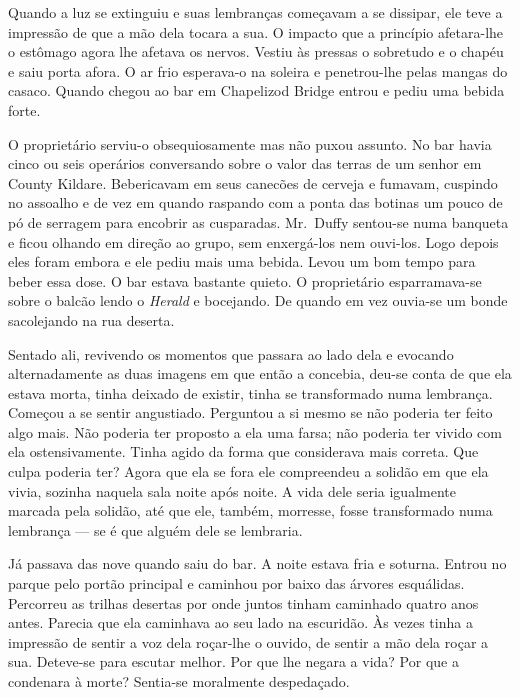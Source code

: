 Quando a luz se extinguiu e suas lembranças começavam a se dissipar, ele teve a
impressão de que a mão dela tocara a sua.  O impacto que a princípio
afetara-lhe o estômago agora lhe afetava os nervos.  Vestiu às pressas o
sobretudo e o chapéu e saiu porta afora.  O ar frio esperava-o na soleira e
penetrou-lhe pelas mangas do casaco.  Quando chegou ao bar em Chapelizod Bridge
entrou e pediu uma bebida forte.

O proprietário serviu-o obsequiosamente mas não puxou assunto.  No bar havia
cinco ou seis operários conversando sobre o valor das terras de um senhor em
County Kildare.  Bebericavam em seus canecões de cerveja e fumavam, cuspindo no
assoalho e de vez em quando raspando com a ponta das botinas um pouco de pó de
serragem para encobrir as cusparadas.  Mr.~Duffy sentou-se numa banqueta e
ficou olhando em direção ao grupo, sem enxergá-los nem ouvi-los.  Logo depois
eles foram embora e ele pediu mais uma bebida.  Levou um bom tempo para beber
essa dose.  O bar estava bastante quieto.  O proprietário esparramava-se sobre
o balcão lendo o \textit{Herald} e bocejando.  De quando em vez ouvia-se um
bonde sacolejando na rua deserta.

Sentado ali, revivendo os momentos que passara ao lado dela e evocando
alternadamente as duas imagens em que então a concebia, deu-se conta de que ela
estava morta, tinha deixado de existir, tinha se transformado numa lembrança.
Começou a se sentir angustiado.  Perguntou a si mesmo se não poderia ter feito
algo mais.  Não poderia ter proposto a ela uma farsa; não poderia ter vivido
com ela ostensivamente.  Tinha agido da forma que considerava mais correta.
Que culpa poderia ter?  Agora que ela se fora ele compreendeu a solidão em que
ela vivia, sozinha naquela sala noite após noite.  A vida dele seria igualmente
marcada pela solidão, até que ele, também, morresse, fosse transformado numa
lembrança --- se é que alguém dele se lembraria.

Já passava das nove quando saiu do bar.  A noite estava fria e soturna.  Entrou
no parque pelo portão principal e caminhou por baixo das árvores esquálidas.
Percorreu as trilhas desertas por onde juntos tinham caminhado quatro anos
antes.  Parecia que ela caminhava ao seu lado na escuridão.  Às vezes tinha a
impressão de sentir a voz dela roçar-lhe o ouvido, de sentir a mão dela roçar a
sua.  Deteve-se para escutar melhor.  Por que lhe negara a vida?  Por que a
condenara à morte?  Sentia-se moralmente despedaçado.

